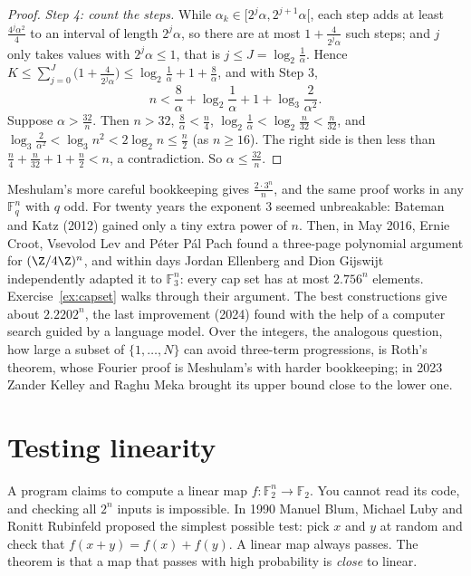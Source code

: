 \begin{proof}
\emph{Step 4: count the steps.} While $\alpha_k\in[2^j\alpha,2^{j+1}\alpha[$, each step adds at least $\frac{4^j\alpha^2}4$ to an interval of length $2^j\alpha$,
so there are at most $1+\frac4{2^j\alpha}$ such steps; and $j$ only takes values with $2^j\alpha\le1$, that is $j\le J=\log_2\frac1\alpha$. Hence
$K\le\sum_{j=0}^J\bigl(1+\frac4{2^j\alpha}\bigr)\le\log_2\frac1\alpha+1+\frac8\alpha$, and with Step 3,
\[n<\frac8\alpha+\log_2\frac1\alpha+1+\log_3\frac2{\alpha^2}.\]
Suppose $\alpha>\frac{32}n$. Then $n>32$, $\frac8\alpha<\frac n4$, $\log_2\frac1\alpha<\log_2\frac n{32}<\frac n{32}$, and $\log_3\frac2{\alpha^2}<\log_3n^2<2\log_2n\le\frac n2$ (as
$n\ge16$). The right side is then less than $\frac n4+\frac n{32}+1+\frac n2<n$, a contradiction. So $\alpha\le\frac{32}n$.
\end{proof}

Meshulam's more careful bookkeeping gives $\frac{2\cdot3^n}n$, and the same proof works in any $\mathbb F_q^n$ with $q$ odd. For twenty years the
exponent $3$ seemed unbreakable: Bateman and Katz (2012) gained only a tiny extra power of $n$. Then, in May 2016, Ernie Croot, Vsevolod Lev and
P\'eter P\'al Pach found a three-page polynomial argument for $(\Z/4\Z)^n$, and within days Jordan Ellenberg and Dion Gijswijt
independently adapted it to $\mathbb F_3^n$: every cap set has at most $2.756^n$ elements. Exercise~\ref{ex:capset} walks through their argument. The best
constructions give about $2.2202^n$, the last improvement (2024) found with the help of a computer search guided by a language model.
Over the integers, the analogous question, how large a subset of $\{1,\dots,N\}$ can avoid three-term progressions, is Roth's theorem,
whose Fourier proof is Meshulam's with harder bookkeeping; in 2023 Zander Kelley and Raghu Meka brought its upper bound close to the
lower one.

\section{Testing linearity}\label{sec:blr}

A program claims to compute a linear map $f:\mathbb F_2^n\to\mathbb F_2$. You cannot read its code, and checking all $2^n$ inputs is
impossible. In 1990 Manuel Blum, Michael Luby and Ronitt Rubinfeld proposed the simplest possible test: pick $x$ and $y$ at random and check
that $f(x+y)=f(x)+f(y)$. A linear map always passes. The theorem is that a map that passes with high probability is \emph{close} to linear.

